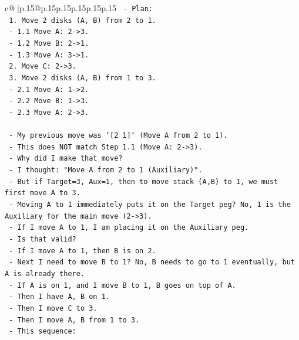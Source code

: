 \documentclass{article}
\begin{document}
{\begin{supertabular}{c@{$\;$}|p{.15\linewidth}@{}p{.15\linewidth}p{.15\linewidth}p{.15\linewidth}p{.15\linewidth}p{.15\linewidth}}
{{{\texttt{           {-} Plan:} \\
\texttt{             1. Move 2 disks (A, B) from 2 to 1.} \\
\texttt{                {-} 1.1 Move A: 2{-}>3.} \\
\texttt{                {-} 1.2 Move B: 2{-}>1.} \\
\texttt{                {-} 1.3 Move A: 3{-}>1.} \\
\texttt{             2. Move C: 2{-}>3.} \\
\texttt{             3. Move 2 disks (A, B) from 1 to 3.} \\
\texttt{                {-} 2.1 Move A: 1{-}>2.} \\
\texttt{                {-} 2.2 Move B: 1{-}>3.} \\
\texttt{                {-} 2.3 Move A: 2{-}>3.} \\
\\ 
\texttt{         {-} My previous move was `{[}2 1{]}` (Move A from 2 to 1).} \\
\texttt{         {-} This does NOT match Step 1.1 (Move A: 2{-}>3).} \\
\texttt{         {-} Why did I make that move?} \\
\texttt{           {-} I thought: "Move A from 2 to 1 (Auxiliary)".} \\
\texttt{           {-} But if Target=3, Aux=1, then to move stack (A,B) to 1, we must first move A to 3.} \\
\texttt{           {-} Moving A to 1 immediately puts it on the Target peg? No, 1 is the Auxiliary for the main move (2{-}>3).} \\
\texttt{           {-} If I move A to 1, I am placing it on the Auxiliary peg.} \\
\texttt{           {-} Is that valid?} \\
\texttt{           {-} If I move A to 1, then B is on 2.} \\
\texttt{           {-} Next I need to move B to 1? No, B needs to go to 1 eventually, but A is already there.} \\
\texttt{           {-} If A is on 1, and I move B to 1, B goes on top of A.} \\
\texttt{           {-} Then I have A, B on 1.} \\
\texttt{           {-} Then I move C to 3.} \\
\texttt{           {-} Then I move A, B from 1 to 3.} \\
\texttt{           {-} This sequence:} \\
}}}
\end{supertabular}}
\end{document}
